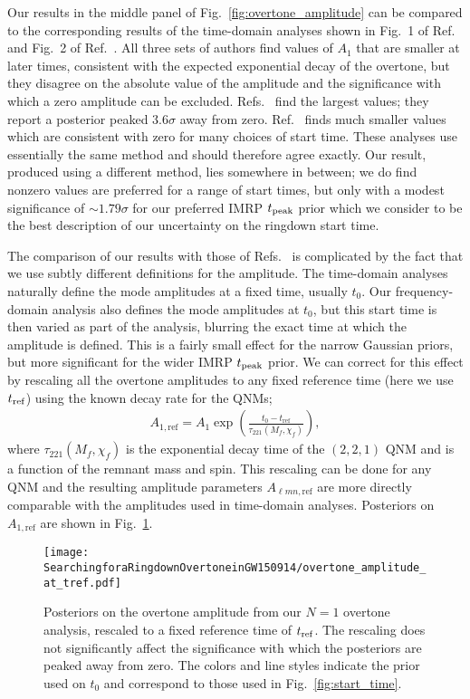 Our results in the middle panel of Fig.~\ref{fig:overtone_amplitude} can be compared to the corresponding results of the time-domain analyses shown in Fig.~1 of Ref.~\cite{Isi:2022mhy} and Fig.~2 of Ref.~\cite{Cotesta:2022pci}.
All three sets of authors find values of $A_1$ that are smaller at later times, consistent with the expected exponential decay of the overtone, but they disagree on the absolute value of the amplitude and the significance with which a zero amplitude can be excluded.
Refs.~\cite{Isi:2019aib, Isi:2022mhy} find the largest values; they report a posterior peaked $3.6\sigma$ away from zero.
Ref.~\cite{Cotesta:2022pci} finds much smaller values which are consistent with zero for many choices of start time.
These analyses use essentially the same method and should therefore agree exactly.
Our result, produced using a different method, lies somewhere in between; we do find nonzero values are preferred for a range of start times, but only with a modest significance of $\sim 1.79\sigma$ for our preferred IMRP $t_{\rm peak}$ prior which we consider to be the best description of our uncertainty on the ringdown start time.

The comparison of our results with those of Refs.~\cite{Isi:2019aib, Cotesta:2022pci, Isi:2022mhy} is complicated by the fact that we use subtly different definitions for the amplitude. 
The time-domain analyses naturally define the mode amplitudes at a fixed time, usually $t_0$.
Our frequency-domain analysis also defines the mode amplitudes at $t_0$, but this start time is then varied as part of the analysis, blurring the exact time at which the amplitude is defined.
This is a fairly small effect for the narrow Gaussian priors, but more significant for the wider IMRP $t_{\rm peak}$ prior.
We can correct for this effect by rescaling all the overtone amplitudes to any fixed reference time (here we use $t_{\rm ref}$) using the known decay rate for the QNMs;
\begin{align}
	A_{1,\mathrm{ref}} = A_1 \exp\left(\frac{t_0-t_{\mathrm{ref}}}{\tau_{221}(M_f,\chi_f)}\right),
\end{align}
where $\tau_{221}(M_f, \chi_f)$ is the exponential decay time of the $(2,2,1)$ QNM and is a function of the remnant mass and spin.
This rescaling can be done for any QNM and the resulting amplitude parameters $A_{\ell m n,\mathrm{ref}}$ are more directly comparable with the amplitudes used in time-domain analyses.
Posteriors on $A_{1,\mathrm{ref}}$ are shown in  
Fig.~\ref{fig:amp_at_tref}.

\begin{figure}[t]
    \centering
    \texttt{[image: SearchingforaRingdownOvertoneinGW150914/overtone\_amplitude\_at\_tref.pdf]}
    \caption[Posteriors on the GW150914 overtone amplitude, rescaled to a fixed reference time]{ 
    Posteriors on the overtone amplitude from our $N=1$ overtone analysis, rescaled to a fixed reference time of $t_{\rm ref}$.
    The rescaling does not significantly affect the significance with which the posteriors are peaked away from zero.
    The colors and line styles indicate the prior used on $t_0$ and correspond to those used in Fig.~\ref{fig:start_time}.
    }
    \label{fig:amp_at_tref}
\end{figure}


